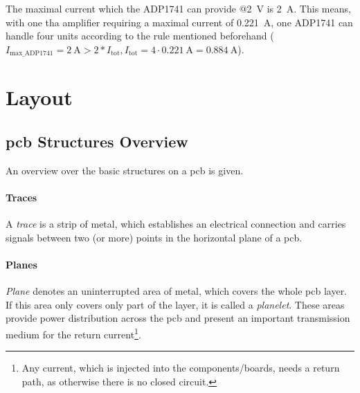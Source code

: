 The maximal current which the ADP1741 can provide @\SI{2}{\volt} is \SI{2}{\ampere}.
This means, with one \gls{tha} amplifier requiring a maximal current of \SI{0.221}{\ampere}, one ADP1741 can handle four units according to the rule mentioned beforehand ($I_{\text{max\_ADP1741}} = \SI{2}{\ampere} > 2 * I_\text{tot}, I_\text{tot} = 4 \cdot \SI{0.221}{\ampere} =  \SI{0.884}{\ampere}$).


\section{Layout}


\subsection{\gls{pcb} Structures Overview} \label{ssec:pcb_structs}
An overview over the basic structures on a \gls{pcb} is given.

\paragraph{Traces}
A \textit{trace} is a strip of metal, which establishes an electrical connection and carries signals between two (or more) points in the horizontal plane of a \gls{pcb}. \cite{xilDecouple}


\paragraph{Planes}
\textit{Plane} denotes an uninterrupted area of metal, which covers the whole \gls{pcb} layer. If this area only covers only part of the layer, it is called a \textit{planelet}. These areas provide power distribution across the \gls{pcb} and present an important transmission medium for the return current\footnote{Any current, which is injected into the components/boards, needs a return path, as otherwise there is no closed circuit.}. \cite{xilDecouple}

